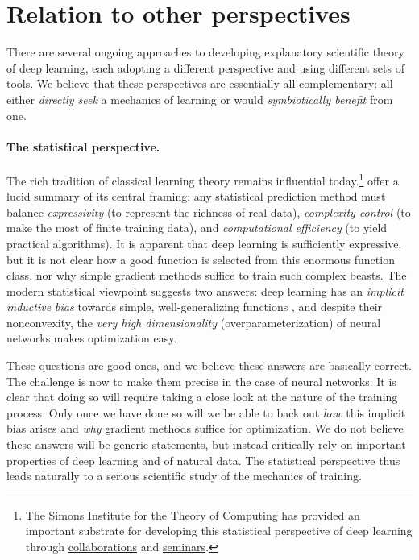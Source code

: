 \section{Relation to other perspectives}
\label{sec:learning_mech_and_mechinterp}

There are several ongoing approaches to developing explanatory scientific theory of deep learning, each adopting a different perspective and using different sets of tools.
We believe that these perspectives are essentially all complementary: all either \textit{directly seek} a mechanics of learning or would \textit{symbiotically benefit} from one.

\paragraph{The statistical perspective.}
The rich tradition of classical learning theory remains influential today.\footnote{
The Simons Institute for the Theory of Computing has provided an important substrate for developing this statistical perspective of deep learning through \href{https://deepfoundations.ai/}{collaborations} and \href{https://simons.berkeley.edu/workshops/deep-learning-theory}{seminars}.
}
\citet{bartlett:2021-statistical-viewpoint} offer a lucid summary of its central framing: any statistical prediction method must balance \textit{expressivity} (to represent the richness of real data), \textit{complexity control} (to make the most of finite training data), and \textit{computational efficiency} (to yield practical algorithms).
It is apparent that deep learning is sufficiently expressive, but it is not clear how a good function is selected from this enormous function class, nor why simple gradient methods suffice to train such complex beasts.
The modern statistical viewpoint suggests two answers: deep learning has an \textit{implicit inductive bias} towards simple, well-generalizing functions \citep{wilsonposition}, and despite their nonconvexity, the \textit{very high dimensionality} (overparameterization) of neural networks makes optimization easy.


These questions are good ones, and we believe these answers are basically correct.
The challenge is now to make them precise in the case of neural networks.
It is clear that doing so will require taking a close look at the nature of the training process.
Only once we have done so will we be able to back out \textit{how} this implicit bias arises and \textit{why} gradient methods suffice for optimization.
We do not believe these answers will be generic statements, but instead critically rely on important properties of deep learning and of natural data.
The statistical perspective thus leads naturally to a serious scientific study of the mechanics of training.

